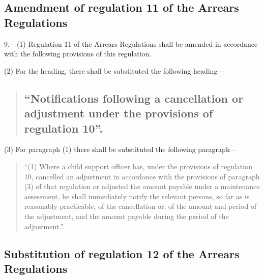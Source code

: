 \documentclass[a4paper]{article}
\begin{document}
\subsection[9. Amendment of regulation 11 of the Arrears Regulations]{Amendment of regulation 11 of the Arrears Regulations}

9.—(1) Regulation 11 of the Arrears Regulations shall be amended in accordance with the following provisions of this regulation.

(2) For the heading, there shall be substituted the following heading—
\begin{quotation}
\subsection*{“Notifications following a cancellation or adjustment under the provisions of regulation 10”.} {}
\end{quotation}

(3) For paragraph (1) there shall be substituted the following paragraph—

\begin{quotation}
“(1) Where a child support officer has, under the provisions of regulation 10, cancelled an adjustment in accordance with the provisions of paragraph (3) of that regulation or adjusted the amount payable under a maintenance assessment, he shall immediately notify the relevant persons, so far as is reasonably practicable, of the cancellation or, of the amount and period of the adjustment, and the amount payable during the period of the adjustment.”.
\end{quotation}

\subsection[10. Substitution of regulation 12 of the Arrears Regulations]{Substitution of regulation 12 of the Arrears Regulations}
\end{document}
